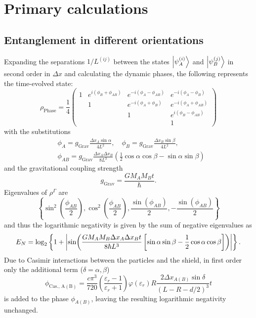 \chapter{Primary calculations}

\section{Entanglement in different orientations}\label{apx:entanglement-orientation}
Expanding the separations $1/L^{(ij)}$ between the states $\ket{\psi^{(i)}_{A}}$ and $\ket{\psi^{(j)}_{B}}$ in second order in $\Delta x$ and calculating the dynamic phases, the following represents the time-evolved state:
\begin{equation}
  \rho_\mathrm{Phase} = \frac{1}{4} \begin{pmatrix}
    1 & e^{i(\phi_B + \phi_{AB})} & e^{-i(\phi_A - \phi_{AB})} & e^{-i(\phi_A - \phi_{B})} \\
    & 1 & e^{-i(\phi_A + \phi_{B})} & e^{-i(\phi_A + \phi_{AB})} \\
    & & 1 & e^{i(\phi_B - \phi_{AB})} \\
    & & & 1
  \end{pmatrix}
\end{equation}
with the substitutions
\begin{align}\label{eq:apx:phi-definition}
  &\phi_A = g_\mathrm{Grav} \frac{\Delta x_A \sin\alpha}{4L^2},\quad
  \phi_B = g_\mathrm{Grav} \frac{\Delta x_B \sin\beta}{4L^2},\\ \label{eq:apx:phi-AB}
  &\phi_{AB} = g_\mathrm{Grav} \frac{\Delta x_A \Delta x_B}{8 L^3} \left(\frac{1}{2}\cos\alpha\cos\beta - \sin\alpha\sin\beta \right)
\end{align}
and the gravitational coupling strength
\begin{equation}
  g_\mathrm{Grav} = \frac{G M_A M_B t}{\hbar} .
\end{equation}
Eigenvalues of $\rho^{\Gamma}$ are
\begin{equation}
  \left\{ \sin^2\left(\frac{\phi_{AB}}{2}\right), \cos^2\left(\frac{\phi_{AB}}{2}\right), \frac{\sin(\phi_{AB})}{2}, -\frac{\sin(\phi_{AB})}{2}\right\}
\end{equation}
and thus the logarithmic negativity is given by the sum of negative eigenvalues as
\begin{equation}
  E_N = \log_2\left\{ 1 + \left\lvert\sin(\frac{G M_A M_B \Delta x_A \Delta x_B t}{8\hbar L^3}\left[\sin\alpha\sin\beta-\frac{1}{2}\cos\alpha\cos\beta\right])\right\rvert \right\} .
\end{equation}
Due to Casimir interactions between the particles and the shield, in first order only the additional term ($\delta = \alpha, \beta$)
\begin{equation}
  \phi_\mathrm{Cas.,\,A(B)} = \frac{c \pi^3}{720}\left(\frac{\varepsilon_r - 1}{\varepsilon_r + 1}\right)\varphi(\varepsilon_r) R \frac{2 \Delta x_{A(B)} \sin\delta}{(L - R - d/2)^3} t
\end{equation}
is added to the phase $\phi_{A(B)}$, leaving the resulting logarithmic negativity unchanged.


